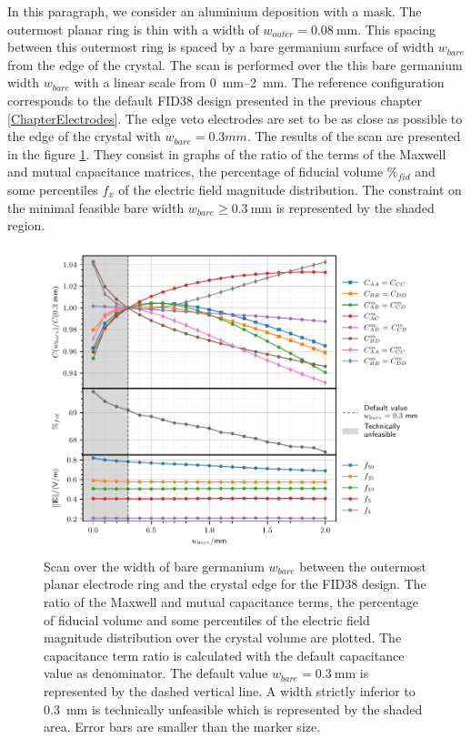 In this paragraph, we consider an aluminium deposition with a mask. The outermost planar ring is thin with a width of $w_{outer}=\SI{0.08}{\mm}$. This spacing between this outermost ring is spaced by a bare germanium surface of width $w_{bare}$ from the edge of the crystal. The scan is performed over the this bare germanium width $w_{bare}$ with a linear scale from \SIrange{0}{2}{\mm}. The reference configuration corresponds to the default FID38 design presented in the previous chapter \ref{ChapterElectrodes}. The edge veto electrodes are set to be as close as possible to the edge of the crystal with $w_{bare}=0.3mm$.
The results of the scan are presented in the figure \ref{fig:capacitance-fiducial-dead-edge}. They consist in graphs of the ratio of the terms of the Maxwell and mutual capacitance matrices, the percentage of fiducial volume $\%_{fid}$ and some percentiles $f_x$ of the electric field magnitude distribution. The constraint on the minimal feasible bare width $w_{bare} \geq \SI{0.3}{\mm}$ is represented by the shaded region.
  
\begin{figure}
\centering
\includegraphics[scale=1]{Figures/ElectrodesScan/capacitance_fiducial_dead_edge.pdf}
\caption{Scan over the width of bare germanium $w_{bare}$ between the outermost planar electrode ring and the crystal edge for the FID38 design. The ratio of the Maxwell and mutual capacitance terms, the percentage of fiducial volume and some percentiles of the electric field magnitude distribution over the crystal volume are plotted. The capacitance term ratio is calculated with the default capacitance value as denominator. The default value $w_{bare}=\SI{0.3}{\mm}$ is represented by the dashed vertical line. A width strictly inferior to \SI{0.3}{\mm} is technically unfeasible which is represented by the shaded area. Error bars are smaller than the marker size.}
\label{fig:capacitance-fiducial-dead-edge}
\end{figure}


